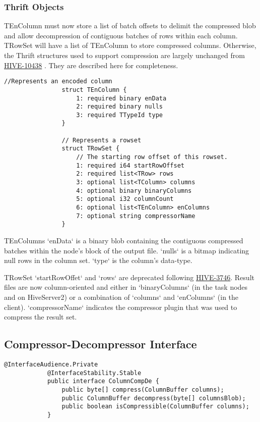 \documentclass[11pt,a4paper]{article}
\begin{document}
		\subsubsection{Thrift Objects}
			TEnColumn must now store a list of batch offsets to delimit the compressed blob and allow decompression of contiguous batches of rows within each column. TRowSet will have a list of TEnColumn to store compressed columns.
			Otherwise, the Thrift structures used to support compression are largely unchanged from 
			\href{https://issues.apache.org/jira/browse/HIVE-10438}{HIVE-10438}
			. They are described here for completeness.
			
			\begin{lstlisting}[title=TCLIService.thrift,gobble=8,otherkeywords={binary,i32,i64,string,struct,TColumn,TEnColumn,TRow,TRowSet,TTypeId}]
				//Represents an encoded column
				struct TEnColumn {
					1: required binary enData
					2: required binary nulls
					3: required TTypeId type
				}
				
				// Represents a rowset
				struct TRowSet {
					// The starting row offset of this rowset.
					1: required i64 startRowOffset
					2: required list<TRow> rows
					3: optional list<TColumn> columns
					4: optional binary binaryColumns
					5: optional i32 columnCount
					6: optional list<TEnColumn> enColumns
					7: optional string compressorName
				}
			\end{lstlisting}
			
			TEnColumns `enData` is a binary blob containing the contiguous compressed batches within the node's block of the output file.
			`nulls` is a bitmap indicating null rows in the column set.
			`type` is the column's data-type.
			
			TRowSet `startRowOffet` and `rows` are deprecated following \href{https://issues.apache.org/jira/browse/HIVE-3746}{HIVE-3746}.
			Result files are now column-oriented and either in `binaryColumns` (in the task nodes and on HiveServer2) or a combination of `columns` and `enColumns` (in the client).
			`compressorName` indicates the compressor plugin that was used to compress the result set.
			
	\subsection{Compressor-Decompressor Interface}
		\begin{lstlisting}[title=org.apache.hive.service.cli.CompDe; CompDe.java,gobble=6,otherkeywords={ColumnBuffer}]
			@InterfaceAudience.Private
			@InterfaceStability.Stable
			public interface ColumnCompDe {
				public byte[] compress(ColumnBuffer columns);
				public ColumnBuffer decompress(byte[] columnsBlob);
				public boolean isCompressible(ColumnBuffer columns);
			}
		\end{lstlisting}
		
\end{document}
